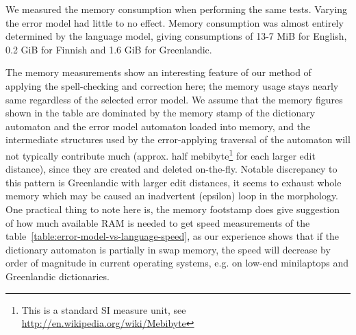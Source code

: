 \documentclass[11pt]{article}
\begin{document}
We measured the memory
consumption when performing the same tests. Varying the error model had little
to no effect. Memory consumption was almost entirely determined by the language
model, giving consumptions of 13-7 MiB for English, 0.2 GiB for Finnish and
1.6 GiB for Greenlandic.


The memory measurements show an interesting feature of our method of applying
the spell-checking and correction here; the memory usage stays nearly same
regardless of the selected error model. We assume that the memory figures shown
in the table are dominated by the memory stamp of the dictionary automaton and
the error model automaton loaded into memory, and the intermediate structures
used by the error-applying traversal of the automaton will not typically
contribute much (approx. half mebibyte\footnote{This is a standard SI measure
unit, see \url{http://en.wikipedia.org/wiki/Mebibyte}} for
each larger edit distance), since they are created and deleted on-the-fly.
Notable discrepancy to this pattern is Greenlandic with larger edit distances,
it seems to exhaust whole memory which may be caused an inadvertent (epsilon)
loop in the morphology. One practical thing to note here is, the memory
footstamp does give suggestion of how much available RAM is needed to get speed
measurements of the table~\ref{table:error-model-vs-language-speed}, as our
experience shows that if the dictionary automaton is partially in swap memory,
the speed will decrease by order of magnitude in current operating systems,
e.g. on low-end minilaptops and Greenlandic dictionaries.
\end{document}
